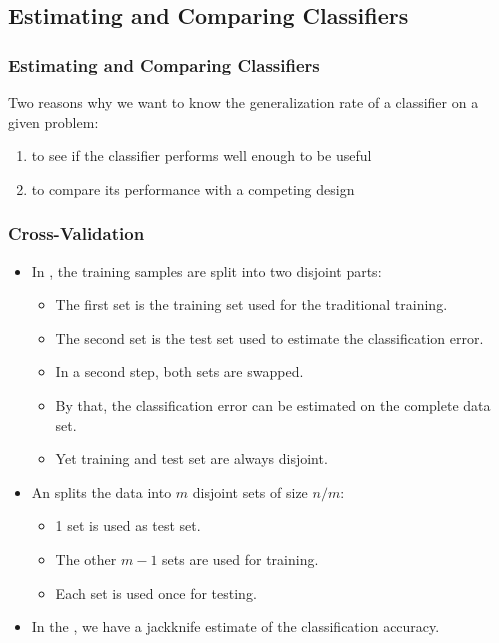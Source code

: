 \subsection{Estimating and Comparing Classifiers}

\begin{frame}
  \frametitle{Estimating and Comparing Classifiers}

  Two reasons why we want to know the generalization rate of a classifier on a given problem:

  \begin{enumerate}
    \item to see if the classifier performs well enough to be useful
    \item to compare its performance with a competing design
  \end{enumerate}
\end{frame}


\begin{frame}
  \frametitle{Cross-Validation}
  
  \begin{itemize}
    \item In , the training samples are split into two disjoint parts:\\[.1cm]
      \begin{itemize}
        \item The first set is the training set used for the traditional training.
        \item The second set is the test set used to estimate the classification error.
        \item In a second step, both sets are swapped. 
        \item By that, the classification error can be estimated on the complete data set.
        \item Yet training and test set are always disjoint. \\[.3cm] \pause
      \end{itemize}
    \item An  splits the data into $m$ disjoint sets of size $n/m$:\\[.1cm]
      \begin{itemize}
        \item 1 set is used as test set.
        \item The other $m-1$ sets are used for training. 
        \item Each set is used once for testing. \\[.3cm] \pause
      \end{itemize}
    \item In the , we have  a jackknife estimate of the classification accuracy.
  \end{itemize}
\end{frame}


